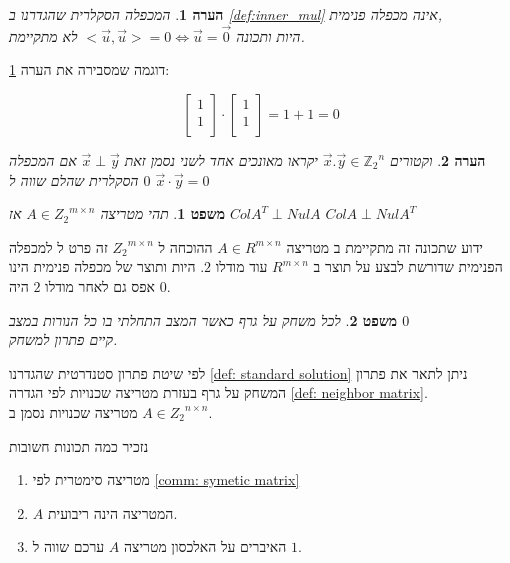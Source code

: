 \documentclass[12pt,leqno]{article}
\newtheorem{theorem}{משפט}[section]
\newtheorem{comm}{הערה}[section]
\newcommand{\Zn}{{\mathbb{Z}_2}^n}
\begin{document}
\begin{comm}
    \label{comm:not_really_inner_mul}
    המכפלה הסקלרית שהגדרנו ב
    \ref{def:inner_mul}
    אינה מכפלה פנימית,
    \\
    היות ותכונה 
    $<\vec{u},\vec{u}> = 0 \Leftrightarrow \vec{u} = \vec{0} $
    לא מתקיימת.
\end{comm}

דוגמה 
שמסבירה את הערה
\ref{comm:not_really_inner_mul}:

\[
    \begin{bmatrix}
    1 \\
    1 \\
    \end{bmatrix}    
    \cdot 
    \begin{bmatrix}
    1 \\
    1 \\
    \end{bmatrix} 
    = 1 + 1 = 0
\]

\begin{comm}
    וקטורים 
    $\vec{x}. \vec{y} \in \Zn $
    יקראו מאונכים אחד לשני נסמן זאת 
    $\vec{x} \perp  \vec{y}$
    אם המכפלה הסקלרית שהלם שווה 
    ל
    $0$
    $\vec{x} \cdot \vec{y} = 0$
\end{comm}

\begin{theorem}
    \label{the: Nul A and Col AT}
    תהי מטריצה 
    $A \in {Z_2}^{m \times n }$
    אז 
    $ColA^T \perp Nul A$
    $ColA \perp Nul A^T$
\end{theorem}

ידוע שתכונה זה מתקיימת 
ב
מטריצה 
$A \in R^{m \times n}$
ההוכחה 
ל
$ {Z_2}^{m \times n}$
זה
פרט ל
למכפלה הפנימית 
שדורשת 
לבצע על תוצר 
ב
$R^{m \times n}$
עוד 
מודלו 
$2$.
היות ותוצר של מכפלה פנימית הינו אפס גם לאחר מודלו 
$2$
היה 
$0$.

\begin{theorem}
    \label{thrm: clean game has solution}
    לכל משחק על גרף כאשר המצב התחלתי בו כל הנורות במצב 
    $0$
    \\
    קיים פתרון למשחק.
\end{theorem}

לפי 
שיטת פתרון סטנדרטית 
שהגדרנו
\ref{def: standard solution}
ניתן לתאר את פתרון המשחק על גרף בעזרת מטריצה
שכנויות לפי הגדרה 
\ref{def: neighbor matrix}.
\\
מטריצה שכנויות
נסמן ב
$A \in {Z_2}^{n \times n}$.

נזכיר כמה תכונות חשובות
\begin{enumerate}
    \item 
    מטריצה סימטרית לפי
    \ref{comm: symetic matrix}
    \item 
    $A$
    המטריצה הינה ריבועית.
    \item 
    האיברים על האלכסון
    מטריצה 
    $A$
    ערכם שווה ל
    $1$.
\end{enumerate}
\end{document}
